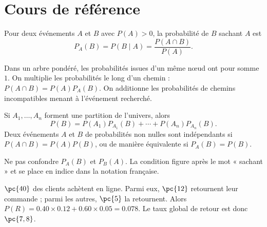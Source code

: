 
\section{Cours de référence}
Pour deux événements $A$ et $B$ avec $P(A)>0$, la probabilité de $B$ sachant $A$ est
\[
P_A(B)=P(B\mid A)=\frac{P(A\cap B)}{P(A)}.
\]

\begin{center}
\end{center}

\begin{keypoint}
Dans un arbre pondéré, les probabilités issues d'un même nœud ont pour somme $1$. On multiplie les probabilités le long d'un chemin : $P(A\cap B)=P(A)P_A(B)$. On additionne les probabilités de chemins incompatibles menant à l'événement recherché.
\end{keypoint}

Si $A_1,\ldots,A_n$ forment une partition de l'univers, alors
\[
P(B)=P(A_1)P_{A_1}(B)+\cdots+P(A_n)P_{A_n}(B).
\]
Deux événements $A$ et $B$ de probabilités non nulles sont indépendants si $P(A\cap B)=P(A)P(B)$, ou de manière équivalente si $P_A(B)=P(B)$.

\begin{pitfall}
Ne pas confondre $P_A(B)$ et $P_B(A)$. La condition figure après le mot « sachant » et se place en indice dans la notation française.
\end{pitfall}

\begin{example}
$\pc{40}$ des clients achètent en ligne. Parmi eux, $\pc{12}$ retournent leur commande ; parmi les autres, $\pc{5}$ la retournent. Alors $P(R)=\num{0,40}\times\num{0,12}+\num{0,60}\times\num{0,05}=\num{0,078}$. Le taux global de retour est donc $\pc{7,8}$.
\end{example}

